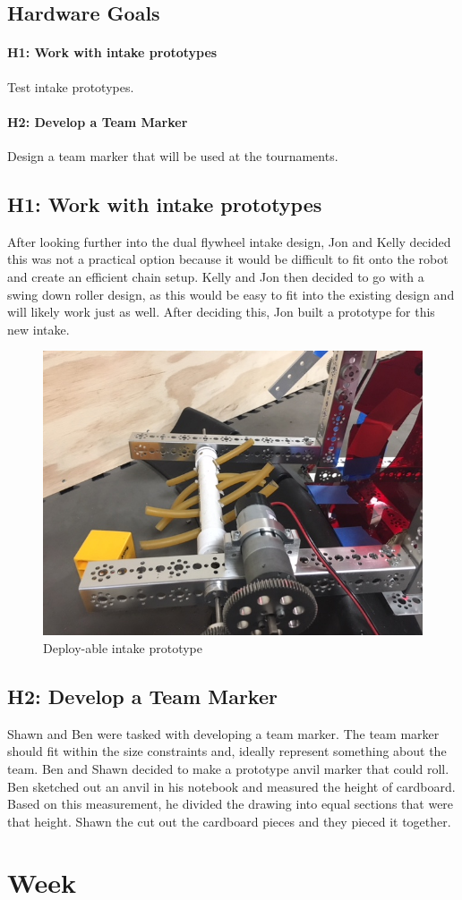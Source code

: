 \documentclass{article}
\begin{document}
\subsection{Hardware Goals}
\paragraph{H1: Work with intake prototypes}
 Test intake prototypes. 
\paragraph{H2: Develop a Team Marker}
 Design a team marker that will be used at the tournaments.
\newpage
\subsection{H1: Work with intake prototypes}

After looking further into the dual flywheel intake design, Jon and Kelly decided this was not a practical option because it would be difficult to fit onto the robot and create an efficient chain setup. Kelly and Jon then decided to go with a swing down roller design, as this would be easy to fit into the existing design and will likely work just as well. After deciding this, Jon built a prototype for this new intake. 

\begin{figure}
    \centering
    \includegraphics[width=.6\textwidth]{03_09-17/images/IMG_0262.JPG}
    \caption{Deploy-able intake prototype}
    \label{fig:my_label}
\end{figure}

\subsection{H2: Develop a Team Marker}

Shawn and Ben were tasked with developing a team marker. The team marker should fit within the size constraints and, ideally represent something about the team. Ben and Shawn decided to make a prototype anvil marker that could roll. Ben sketched out an anvil in his notebook and measured the height of cardboard. Based on this measurement, he divided the drawing into equal sections that were that height. Shawn the cut out the cardboard pieces and they pieced it together.\clearpage \newpage \section{Week \thesection} 
\end{document}
